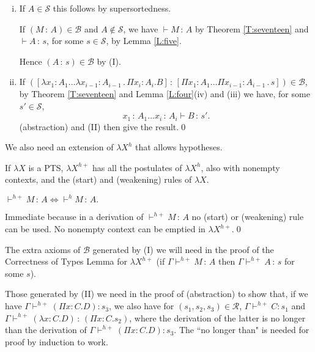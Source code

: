 \documentclass{LMCS}
\def\:{\mathbin{\,:\,}}
\def\.{\mathbin{\,.\,}}
\begin{document}
\proof\hfill

\begin{enumerate}[(i)]
\item If $A\in\mathcal S$ this follows by supersortedness.

  \noindent If $(M\:A)\in\mathcal B$ and $A\notin\mathcal S$, we have
  $\vdash M\:A$ by Theorem \ref{T:seventeen} and $\vdash A\:s$, for
  some $s\in\mathcal S$, by Lemma \ref{L:five}.

  \noindent Hence $(A\:s)\in\mathcal B$ by (I).

\item If $([\lambda x_1{:}A_1\ldots\lambda x_{i-1}{:}A_{i-1}\.\Pi
  x_i{:}A_i.B]\:[\Pi x_1{:}A_1\ldots\Pi x_{i-1}{:}A_{i-1}\.s])
 \in\mathcal B$, by Theorem \ref{T:seventeen} and Lemma
  \ref{L:four}(iv) and (iii) we have, for some $s'\in\mathcal S$,
\[x_1\:A_1\ldots x_i\:A_i\vdash B\:s'.\]
  (abstraction) and (II) then give the result.\qed
\end{enumerate}

 \noindent We also need an extension of $\lambda X^h$ that allows hypotheses.

\begin{defi}[$\lambda X^{h+}$]\label{D:lam}
  If $\lambda X$ is a PTS, $\lambda X^{h+}$ has all the postulates of
  $\lambda X^h$, also with nonempty contexts, and the (start) and
  (weakening) rules of $\lambda X$.
\end{defi}

\begin{lem}\label{L:nineteen}
  $\vdash^{h+} M\:A\Leftrightarrow\vdash^h M\:A.$
\end{lem}

\proof Immediate because in a derivation of $\vdash^{h+} M\:A$ no
  (start) or (weakening) rule can be used. No nonempty context can be
  emptied in $\lambda X^{h+}$.\qed

  The extra axioms of ${\mathcal B}$ generated by (I) we will need in
  the proof of the Correctness of Types Lemma for $\lambda X^{h+}$ (if
  $\Gamma\vdash^{h+} M\:A$ then $\Gamma\vdash^{h+} A\:s$ for some $s$).

  Those generated by (II) we need in the proof of (abstraction) to
  show that, if we have $\Gamma\vdash^{h+}(\Pi x{:}C.D):s_3$, we also
  have for $(s_1, s_2, s_3)\in {\mathcal R}$, $\Gamma\vdash^{h+}
  C:s_1$ and $\Gamma\vdash^{h+}(\lambda x{:}C.D)\:(\Pi x{:}C.s_2)$,
  where the derivation of the latter is no longer than the derivation
  of $\Gamma\vdash^{h+}(\Pi x{:}C.D):s_3$. The ``no longer than" is
  needed for proof by induction to work.
\end{document}
